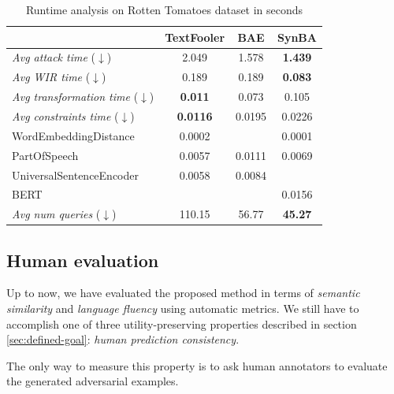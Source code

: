 \begin{table}[h]
    \footnotesize
    \centering
    \begin{tabular}{|l||c|c|c|}
        \hline
        {} &            \textbf{TextFooler} &   \textbf{BAE} &    \textbf{SynBA} \\
        \hline \hline
        \emph{Avg attack time} ($\downarrow$)            &  2.049 &   1.578 &   \textbf{1.439} \\
        \hline
        \emph{Avg WIR time} ($\downarrow$)               &  0.189 &   0.189 &  \textbf{0.083} \\
        \hline
        \emph{Avg transformation time} ($\downarrow$)    &  \textbf{0.011} &   0.073 &   0.105 \\
        \hline
        \emph{Avg constraints time} ($\downarrow$)       &  \textbf{0.0116}       &  0.0195        &   0.0226       \\
        WordEmbeddingDistance        &  0.0002 &          &   0.0001 \\
        PartOfSpeech                 &  0.0057 &  0.0111  &   0.0069 \\
        UniversalSentenceEncoder     &  0.0058 &  0.0084  &          \\
        BERT                         &         &          &   0.0156 \\
        \hline
        \emph{Avg num queries} ($\downarrow$)            &  110.15 &    56.77 &    \textbf{45.27} \\
        \hline
        \end{tabular}
    \caption{Runtime analysis on Rotten Tomatoes dataset in seconds}
    \label{tab:runtime-rotten}
\end{table}



\subsection{Human evaluation}\label{subsec:human-evaluation}

Up to now, we have evaluated the proposed method in terms of \emph{semantic similarity} and \emph{language fluency} using automatic metrics.
We still have to accomplish one of three utility-preserving properties described in section \ref{sec:defined-goal}: \emph{human prediction consistency}.

The only way to measure this property is to ask human annotators to evaluate the generated adversarial examples.

